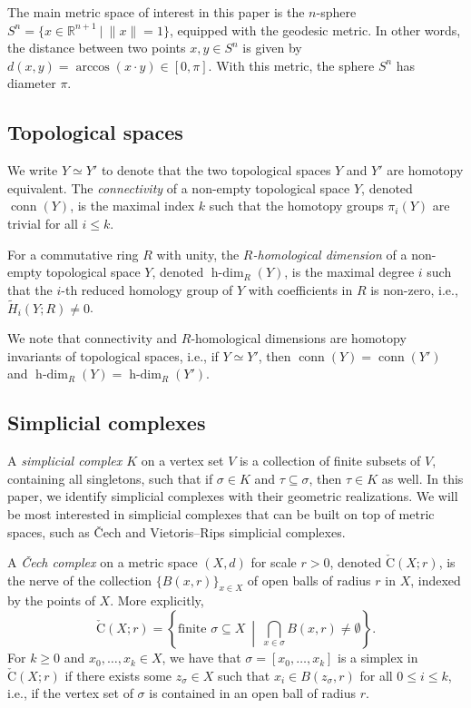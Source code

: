 \documentclass[11 pt,a4paper,twoside,reqno]{amsart}
\theoremstyle{definition}
\def\R{{\mathbb R}}
\newcommand{\cech}[2]{\mathrm{\check{C}}(#1;#2)}
\DeclareMathOperator{\conn}{conn}
\DeclareMathOperator{\hdim}{h-dim}
\begin{document}
The main metric space of interest in this paper is the $n$-sphere $S^n=\{x\in\R^{n+1}~|~\|x\|=1\}$, equipped with the geodesic metric.
In other words, the distance between two points $x,y\in S^n$ is given by $d(x,y)=\arccos(x\cdot y)\in[0,\pi]$.
With this metric, the sphere $S^n$ has diameter $\pi$.



\subsection{Topological spaces}

We write $Y\simeq Y'$ to denote that the two topological spaces $Y$ and $Y'$ are homotopy equivalent.
The \emph{connectivity} of a non-empty topological space $Y$, denoted $\conn(Y)$, is the maximal index $k$ such that the homotopy groups $\pi_i(Y)$ are trivial for all $i\le k$.

For a commutative ring $R$ with unity, the \emph{$R$-homological dimension} of a non-empty topological space $Y$, denoted $\hdim_R(Y)$, is the maximal degree $i$ such that the $i$-th reduced homology group of $Y$ with coefficients in $R$ is non-zero, i.e., $\widetilde{H}_i(Y; R)\neq 0$.

We note that connectivity and $R$-homological dimensions are homotopy invariants of topological spaces, i.e., if $Y\simeq Y'$, then $\conn(Y)=\conn(Y')$ and $\hdim_R(Y)=\hdim_R(Y')$.



\subsection{Simplicial complexes}

A \emph{simplicial complex $K$} on a vertex set $V$ is a collection of {finite} subsets of $V$, containing all singletons, such that if $\sigma\in K$ and $\tau\subseteq \sigma$, then $\tau \in K$ as well.
In this paper, we identify simplicial complexes with their geometric realizations. 
We will be most interested in simplicial complexes that can be built on top of metric spaces, such as \v{C}ech and Vietoris--Rips simplicial complexes.

A \emph{\v{C}ech complex} on a metric space $(X,d)$ for scale $r > 0$, denoted $\cech{X}{r}$, is the nerve of the collection $\{B(x,r)\}_{x \in X}$ of open balls of radius $r$ in $X$, indexed by the points of $X$.
More explicitly,
\[
\cech{X}{r} = \left\{ \text{finite }\sigma \subseteq X\ \middle|\ \bigcap_{x \in \sigma}B(x,r) \ne \emptyset \right\}.
\]
For $k\ge 0$ and $x_0,\ldots,x_k\in X$, we have that $\sigma = [x_0,\ldots,x_k]$ is a simplex in $\cech{X}{r}$ if there exists some $z_{\sigma} \in X$ such that $x_i \in B(z_{\sigma},r)$ for all $0 \le i \le k$, i.e., if the vertex set of $\sigma$ is contained in an open ball of radius $r$.
\end{document}
